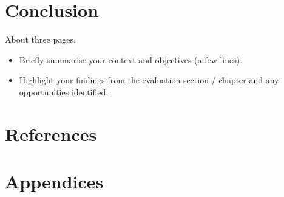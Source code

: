 \chapter{Conclusion}
About three pages.
\begin{itemize}
\item Briefly summarise your context and objectives (a few lines).
\item Highlight your findings from the evaluation section / chapter and any opportunities identified.
\end{itemize}
\chapter{References}
\chapter{Appendices}
